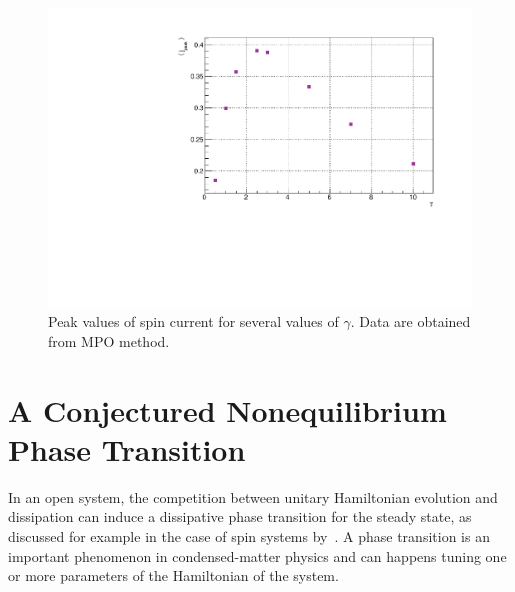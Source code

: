 
\begin{figure}[H]
    \centering
    \includegraphics[scale=0.7]{Figures/PeakValueSpinCurrVSgamma_8sites.pdf}
    \captionsetup{width=1.\linewidth}
    \caption{Peak values of spin current for several values of $\gamma$. Data are obtained from MPO method.}
    \label{fig:PeakValueSpinCurrVSgamma_8sites}
\end{figure}


\section{A Conjectured Nonequilibrium Phase Transition}

In an open system, the competition between unitary Hamiltonian evolution and dissipation can induce a dissipative phase transition for the steady state, as discussed for example in the case of spin systems by~\cite{phase_trans_spin_system}.
A phase transition is an important phenomenon in condensed-matter physics and can happens tuning one or more parameters of the Hamiltonian of the system. 

